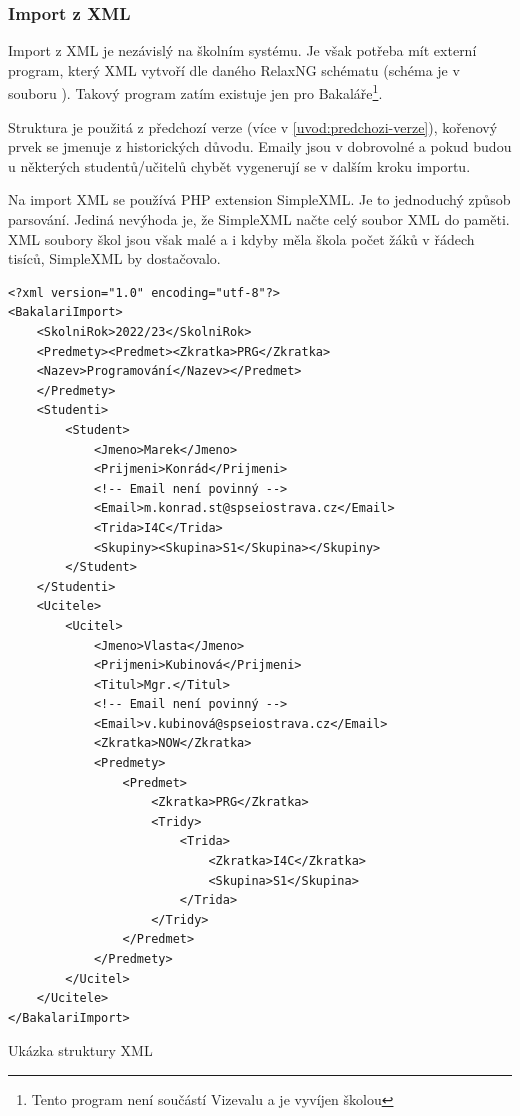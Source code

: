 \subsubsection{Import z XML}
Import z XML je nezávislý na školním systému. Je však potřeba mít externí program, který XML vytvoří dle daného RelaxNG schématu (schéma je v souboru ).
Takový program zatím existuje jen pro Bakaláře\footnote{Tento program není součástí Vizevalu a je vyvíjen školou}.

Struktura je použitá z předchozí verze (více v \ref{uvod:predchozi-verze}), kořenový prvek se jmenuje  z historických důvodu. Emaily jsou v dobrovolné a pokud budou u některých studentů/učitelů chybět vygenerují se v dalším kroku importu.

Na import XML se používá PHP extension SimpleXML. Je to jednoduchý způsob parsování. Jediná nevýhoda je, že SimpleXML načte celý soubor XML do paměti. XML soubory škol jsou však malé a i kdyby měla škola počet žáků v řádech tisíců, SimpleXML by dostačovalo. 




\begin{code}[H]
  \begin{verbatim}
<?xml version="1.0" encoding="utf-8"?>
<BakalariImport>
    <SkolniRok>2022/23</SkolniRok>
    <Predmety><Predmet><Zkratka>PRG</Zkratka>
    <Nazev>Programování</Nazev></Predmet>
    </Predmety>
    <Studenti>
        <Student>
            <Jmeno>Marek</Jmeno>
            <Prijmeni>Konrád</Prijmeni>
            <!-- Email není povinný -->
            <Email>m.konrad.st@spseiostrava.cz</Email>
            <Trida>I4C</Trida>
            <Skupiny><Skupina>S1</Skupina></Skupiny>
        </Student>
    </Studenti>
    <Ucitele>
        <Ucitel>
            <Jmeno>Vlasta</Jmeno>
            <Prijmeni>Kubinová</Prijmeni>
            <Titul>Mgr.</Titul>
            <!-- Email není povinný -->
            <Email>v.kubinová@spseiostrava.cz</Email>
            <Zkratka>NOW</Zkratka>
            <Predmety>
                <Predmet>
                    <Zkratka>PRG</Zkratka>
                    <Tridy>
                        <Trida>
                            <Zkratka>I4C</Zkratka>
                            <Skupina>S1</Skupina>
                        </Trida>
                    </Tridy>
                </Predmet>
            </Predmety>
        </Ucitel>       
    </Ucitele>
</BakalariImport>
\end{verbatim}
\caption{Ukázka struktury XML}
\end{code}




